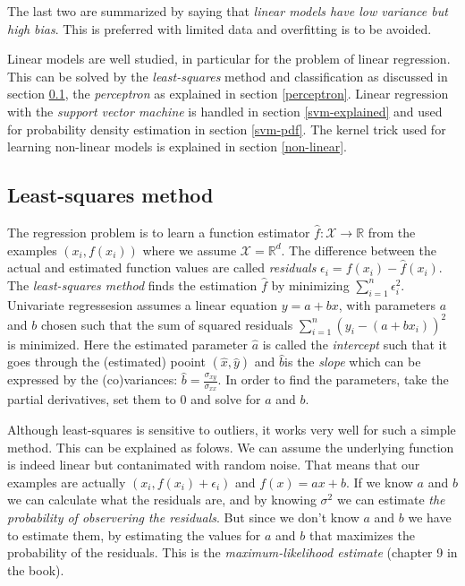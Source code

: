The last two are summarized by saying that \emph{linear models have low variance but high bias}.
This is preferred with limited data and overfitting is to be avoided.

Linear models are well studied, in particular for the problem of linear regression.
This can be solved by the \emph{least-squares} method and classification as discussed in section \ref{least-squares}, the \emph{perceptron} as explained in section \ref{perceptron}.
Linear regression with the \emph{support vector machine} is handled in section \ref{svm-explained} and used for probability density estimation in section \ref{svm-pdf}.
The kernel trick used for learning non-linear models is explained in section \ref{non-linear}.

\subsection{Least-squares method}\label{least-squares}
The regression problem is to learn a function estimator $\hat{f}:\mathcal{X} \to \mathbb{R}$ from the examples $(x_i, f(x_i))$ where we assume $\mathcal{X} = \mathbb{R}^d$.
The difference between the actual and estimated function values are called \emph{residuals} $\epsilon_i = f(x_i) - \hat{f}(x_i)$.
The \emph{least-squares method} finds the estimation $\hat{f}$ by minimizing $\sum_{i=1}^{n} \epsilon_i^2$.
Univariate regressesion assumes a linear equation $y = a + b x$, with parameters $a$ and $b$ chosen such that the sum of squared residuals $\sum_{i=1}^{n} (y_i - (a + b x_i))^2$ is minimized.
Here the estimated parameter $\hat{a}$ is called the \emph{intercept} such that it goes through the (estimated) pooint $(\hat{x},\hat{y})$ and $\hat{b}$is the \emph{slope} which can be expressed by the (co)variances: $\hat{b} = \frac{\sigma_{xy}}{\sigma_{xx}}$.
In order to find the parameters, take the partial derivatives, set them to $0$ and solve for $a$ and $b$.

Although least-squares is sensitive to outliers, it works very well for such a simple method.
This can be explained as folows.
We can assume the underlying function is indeed linear but contanimated with random noise.
That means that our examples are actually $(x_i, f(x_i) + \epsilon_i)$ and $f(x) = ax + b$.
If we know $a$ and $b$ we can calculate what the residuals are, and by knowing $\sigma^2$ we can estimate \emph{the probability of observering the residuals}.
But since we don't know $a$ and $b$ we have to estimate them, by estimating the values for $a$ and $b$ that maximizes the probability of the residuals.
This is the \emph{maximum-likelihood estimate} (chapter 9 in the book).

